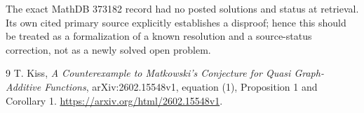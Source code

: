 \documentclass[11pt]{article}
\begin{document}
The exact MathDB 373182 record had no posted solutions and status
 at retrieval. Its own cited primary source \cite{Kiss}
explicitly establishes a disproof; hence this should be treated as a
formalization of a known resolution and a source-status correction,
not as a newly solved open problem.
\begin{thebibliography}{9}
 T. Kiss, \emph{A Counterexample to Matkowski's Conjecture for
Quasi Graph-Additive Functions}, arXiv:2602.15548v1, equation (1),
Proposition 1 and Corollary 1.
\url{https://arxiv.org/html/2602.15548v1}.
\end{thebibliography}
\end{document}
